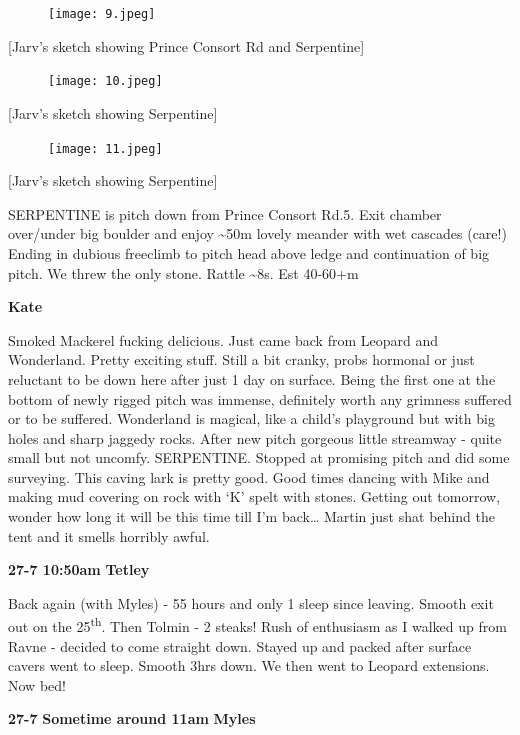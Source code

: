 \begin{figure}[htbp]
\centering
\texttt{[image: 9.jpeg]}
\caption{}
\end{figure}

{[}Jarv's sketch showing Prince Consort Rd and Serpentine{]}

\begin{figure}[htbp]
\centering
\texttt{[image: 10.jpeg]}
\caption{}
\end{figure}

{[}Jarv's sketch showing Serpentine{]}

\begin{figure}[htbp]
\centering
\texttt{[image: 11.jpeg]}
\caption{}
\end{figure}

{[}Jarv's sketch showing Serpentine{]}

SERPENTINE is pitch down from Prince Consort Rd.5. Exit chamber
over/under big boulder and enjoy \textasciitilde{}50m lovely meander
with wet cascades (care!) Ending in dubious freeclimb to pitch head
above ledge and continuation of big pitch. We threw the only stone.
Rattle \textasciitilde{}8s. Est 40-60+m

\textbf{Kate}

Smoked Mackerel fucking delicious. Just came back from Leopard and
Wonderland. Pretty exciting stuff. Still a bit cranky, probs hormonal or
just reluctant to be down here after just 1 day on surface. Being the
first one at the bottom of newly rigged pitch was immense, definitely
worth any grimness suffered or to be suffered. Wonderland is magical,
like a child's playground but with big holes and sharp jaggedy rocks.
After new pitch gorgeous little streamway - quite small but not uncomfy.
SERPENTINE. Stopped at promising pitch and did some surveying. This
caving lark is pretty good. Good times dancing with Mike and making mud
covering on rock with `K' spelt with stones. Getting out tomorrow,
wonder how long it will be this time till I'm back\ldots{} Martin just
shat behind the tent and it smells horribly awful.

\textbf{27-7 10:50am} \textbf{Tetley}

Back again (with Myles) - 55 hours and only 1 sleep since leaving.
Smooth exit out on the 25\textsuperscript{th}. Then Tolmin - 2 steaks!
Rush of enthusiasm as I walked up from Ravne - decided to come straight
down. Stayed up and packed after surface cavers went to sleep. Smooth
3hrs down. We then went to Leopard extensions. Now bed!

\textbf{27-7} \textbf{Sometime around 11am} \textbf{Myles}

